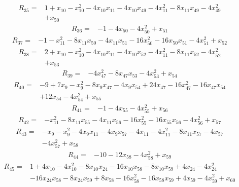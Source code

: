 \[
\begin{aligned}
R_{35}={}&1+x_{10}-x_{10}^{2}-4x_{10}x_{11}-4x_{10}x_{49}-4x_{11}^{2}-8x_{11}x_{49}-4x_{49}^{2}\\
&+x_{50}
\end{aligned}
\]
\[
\begin{aligned}
R_{36}={}&-1-4x_{50}-4x_{50}^{2}+x_{51}
\end{aligned}
\]
\[
\begin{aligned}
R_{37}={}&-1-x_{11}^{2}-8x_{11}x_{50}-4x_{11}x_{51}-16x_{50}^{2}-16x_{50}x_{51}-4x_{51}^{2}+x_{52}
\end{aligned}
\]
\[
\begin{aligned}
R_{38}={}&2+x_{10}-x_{10}^{2}-4x_{10}x_{11}-4x_{10}x_{52}-4x_{11}^{2}-8x_{11}x_{52}-4x_{52}^{2}\\
&+x_{53}
\end{aligned}
\]
\[
\begin{aligned}
R_{39}={}&-4x_{47}^{2}-8x_{47}x_{53}-4x_{53}^{2}+x_{54}
\end{aligned}
\]
\[
\begin{aligned}
R_{40}={}&-9+7x_{9}-x_{9}^{2}-8x_{9}x_{47}-4x_{9}x_{54}+24x_{47}-16x_{47}^{2}-16x_{47}x_{54}\\
&+12x_{54}-4x_{54}^{2}+x_{55}
\end{aligned}
\]
\[
\begin{aligned}
R_{41}={}&-1-4x_{55}-4x_{55}^{2}+x_{56}
\end{aligned}
\]
\[
\begin{aligned}
R_{42}={}&-x_{11}^{2}-8x_{11}x_{55}-4x_{11}x_{56}-16x_{55}^{2}-16x_{55}x_{56}-4x_{56}^{2}+x_{57}
\end{aligned}
\]
\[
\begin{aligned}
R_{43}={}&-x_{9}-x_{9}^{2}-4x_{9}x_{11}-4x_{9}x_{57}-4x_{11}-4x_{11}^{2}-8x_{11}x_{57}-4x_{57}\\
&-4x_{57}^{2}+x_{58}
\end{aligned}
\]
\[
\begin{aligned}
R_{44}={}&-10-12x_{58}-4x_{58}^{2}+x_{59}
\end{aligned}
\]
\[
\begin{aligned}
R_{45}={}&1+4x_{10}-4x_{10}^{2}-8x_{10}x_{24}-16x_{10}x_{58}-8x_{10}x_{59}+4x_{24}-4x_{24}^{2}\\
&-16x_{24}x_{58}-8x_{24}x_{59}+8x_{58}-16x_{58}^{2}-16x_{58}x_{59}+4x_{59}-4x_{59}^{2}+x_{60}
\end{aligned}
\]
